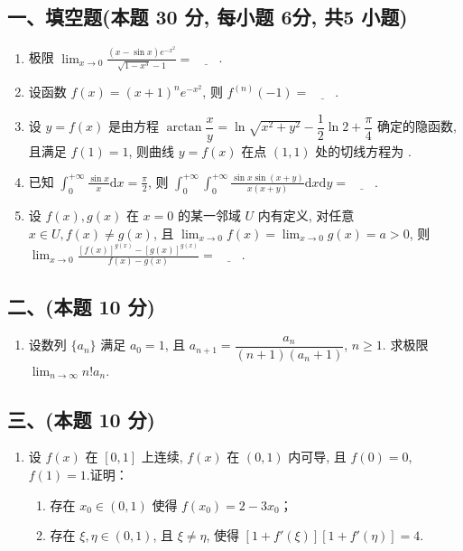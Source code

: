 \subsection*{一、填空题(本题 30 分,  每小题 6分,  共5 小题)}
\begin{enumerate}
    \item 极限 $\displaystyle\lim_{x \to 0} \frac{(x - \sin x) e^{-x^2}}{\sqrt{1 - x^3} - 1} = \underline{\quad\quad}$.
    \item 设函数 $f(x) = (x + 1)^n e^{-x^2}$, 则 $f^{(n)}(-1) = \underline{\quad\quad}$.
    \item 设 $y = f(x)$ 是由方程 $\arctan \dfrac{x}{y} = \ln \sqrt{x^2 + y^2} - \dfrac{1}{2} \ln 2 + \dfrac{\pi}{4}$ 确定的隐函数, 且满足 $f(1) = 1$, 则曲线 $y = f(x)$ 在点 $(1,  1)$ 处的切线方程为 \underline{\quad\quad}.
    \item 已知 $\displaystyle\int_0^{+\infty} \frac{\sin x}{x}  \mathrm{d}x = \frac{\pi}{2}$, 则 $\displaystyle\int_0^{+\infty} \int_0^{+\infty} \frac{\sin x \sin (x + y)}{x(x + y)}  \mathrm{d}x  \mathrm{d}y = \underline{\quad\quad}$.
    \item 设 $f(x),  g(x)$ 在 $x = 0$ 的某一邻域 $U$ 内有定义, 对任意 $x \in U,  f(x) \neq g(x)$, 且 $\displaystyle\lim_{x \to 0} f(x) = \lim_{x \to 0} g(x) = a > 0$, 则 $\displaystyle\lim_{x \to 0} \frac{[f(x)]^{g(x)} - [g(x)]^{g(x)}}{f(x) - g(x)} = \underline{\quad\quad}$.
\end{enumerate}

\subsection*{二、(本题 10 分)}
\begin{enumerate}[start=6]
    \item 设数列 $\{a_n\}$ 满足 $a_0 = 1$, 且 $a_{n+1} = \dfrac{a_n}{(n+1)(a_n+1)}$, $n \geqslant 1$.
          求极限 $\displaystyle\lim_{n \to \infty} n! a_n$.
\end{enumerate}

\subsection*{三、(本题 10 分)}
\begin{enumerate}[start=7]
    \item 设 $f(x)$ 在 $[0, 1]$ 上连续, $f(x)$ 在 $(0, 1)$ 内可导, 且 $f(0) = 0$, $f(1) = 1$.证明：
          \begin{enumerate}
              \item [(1)] 存在 $x_0 \in (0, 1)$ 使得 $f(x_0) = 2 - 3x_0$；
              \item [(2)] 存在 $\xi,  \eta \in (0, 1)$, 且 $\xi \neq \eta$, 使得 $[1 + f'(\xi)][1 + f'(\eta)] = 4$.
          \end{enumerate}
\end{enumerate}

